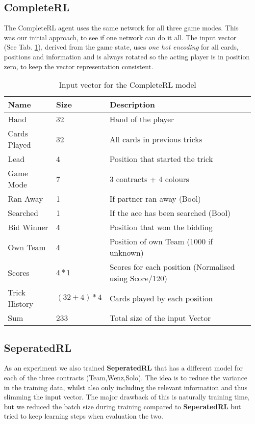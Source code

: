 {\subsection{CompleteRL}
The CompleteRL agent uses the same network for all three game modes.
This was our initial approach, to see if one network can do it all.
The input vector (See Tab. \ref{tab:completerlinput}), derived from the game state, uses \textit{one hot encoding}
for all cards, positions and information and is always rotated so the acting player is in position zero, to keep the
vector representation
consistent.\\
\begin{table}[!h]
\centering
\begin{tabular}{lll}
\toprule
Name          & Size     & Description                                           \\
\midrule
Hand          & 32       & Hand of the player                                    \\
Cards Played  & 32       & All cards in previous tricks                          \\
Lead          & 4        & Position that started the trick                       \\
Game Mode     & 7        & 3 contracts + 4 colours                               \\
Ran Away      & 1        & If partner ran away (Bool)                            \\
Searched      & 1        & If the ace has been searched (Bool)                   \\
Bid Winner    & 4        & Position that won the bidding                         \\
Own Team      & 4        & Position of own Team (1000 if unknown)                \\
Scores        & \(4*1\)      & Scores for each position (Normalised using Score/120) \\
Trick History & \((32+4)*4\) & Cards played by each position                        \\
\midrule
Sum & 233 & Total size of the input Vector\\
\bottomrule
\end{tabular}
\label{tab:completerlinput}
\caption{Input vector for the CompleteRL model}

\end{table}

\subsection{SeperatedRL}
As an experiment we also trained \textbf{SeperatedRL} that has a different model for each of the three contracts
(Team,Wenz,Solo).
The idea is to reduce the variance in the training data, whilst also only including the relevant information and thus
slimming the input vector.
The major drawback of this is naturally training time, but we reduced the batch size during training compared to
\textbf{SeperatedRL} but tried to keep learning steps when evaluation the two.

}
